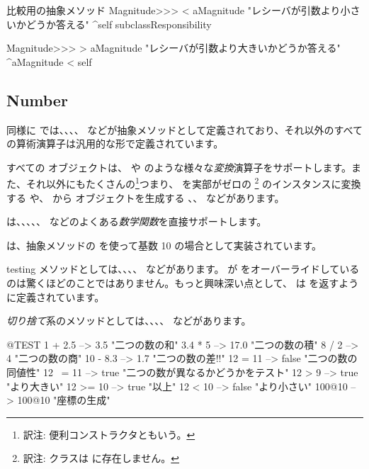 \documentclass[a4paper,10pt,twoside]{book}
\begin{document}
\begin{method}{比較用の抽象メソッド}
Magnitude>>> < aMagnitude 
    "レシーバが引数より小さいかどうか答える"
    ^self subclassResponsibility

Magnitude>>> > aMagnitude 
    "レシーバが引数より大きいかどうか答える"
    ^aMagnitude < self
\end{method}

\subsection{Number}

同様に  では、、、、 などが抽象メソッドとして定義されており、それ以外のすべての算術演算子は汎用的な形で定義されています。

すべての  オブジェクトは、 や  のような様々な\emph{変換}演算子をサポートします。また、それ以外にもたくさんの\footnote{訳注: 便利コンストラクタともいう。}つまり、 を実部がゼロの \footnote{訳注:  クラスは  に存在しません。} のインスタンスに変換する  や、 から  オブジェクトを生成する 、、 などがあります。

 は、、、、、 などのよくある\emph{数学関数}を直接サポートします。

 は、抽象メソッドの  を使って基数 10 の場合として実装されています。

testing メソッドとしては、、、、 などがあります。 が  をオーバーライドしているのは驚くほどのことではありません。もっと興味深い点として、 は  を返すように定義されています。

\emph{切り捨て}系のメソッドとしては、、、、 などがあります。

\begin{code}{@TEST}
1 + 2.5     --> 3.5             "二つの数の和"
3.4 * 5      --> 17.0           "二つの数の積"
8 / 2         --> 4                 "二つの数の商"
10 - 8.3   --> 1.7              "二つの数の差!\footnotemark!"
12 = 11    --> false           "二つの数の同値性"
12 ~= 11 --> true            "二つの数が異なるかどうかをテスト"
12 > 9      --> true            "より大きい"
12 >= 10  --> true            "以上"
12 < 10    --> false           "より小さい"
100@10   --> 100@10    "座標の生成"
\end{code}
\end{document}
